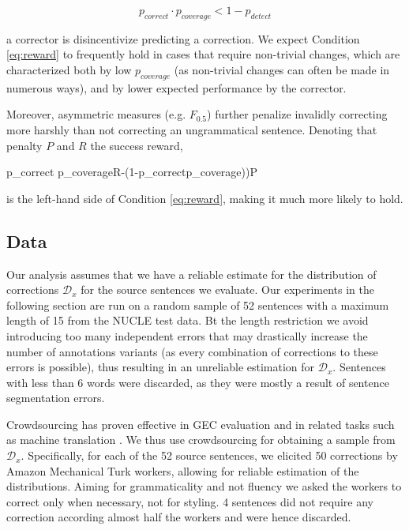 \documentclass[letter,11pt]{article}
\newenvironment{myequation}{
  \vspace{-1em}
 \begin{equation}
}{
 \end{equation}
 \vspace{-1.2em}
}
\newenvironment{myequation*}{
	\vspace{-1em}
	\begin{equation*}
}{
\end{equation*}
\vspace{-1.2em}
}
\begin{document}
\begin{small}
\begin{myequation}
  \label{eq:reward}
  p_{correct} \cdot p_{coverage} < 1-p_{detect} 
\end{myequation}
\end{small}

a corrector is disincentivize predicting a correction.
We expect Condition \ref{eq:reward} to frequently hold in cases that
require non-trivial changes, which are characterized both by low $p_{coverage}$ (as non-trivial
changes can often be made in numerous ways), and by lower expected performance by the corrector.

Moreover, asymmetric measures (e.g. $F_{0.5}$) further penalize invalidly correcting more harshly than not correcting an ungrammatical sentence. Denoting that penalty $P$ and $R$ the success reward, 

\begin{small}
	\begin{myequation*}
		p_{correct} \cdot p_{coverage}\cdot R-\left(1-p_{correct}p_{coverage})\right)\cdot P
	\end{myequation*}
\end{small}

 is the left-hand side of Condition \ref{eq:reward}, making it much more likely to hold.
\subsection{Data}
%
Our analysis assumes that we have a reliable estimate for the distribution of corrections
$\mathcal{D}_x$ for the source sentences we evaluate.
Our experiments in the following section are run on a random sample of 52 sentences with a
maximum length of 15 from the NUCLE test data.
Bt the length restriction we avoid introducing too many independent errors that may drastically increase
the number of annotations variants (as every combination of corrections to these errors is possible),
thus resulting in an unreliable estimation for $\mathcal{D}_x$.
Sentences with less than 6 words were discarded, as they were mostly a result of sentence segmentation errors.

Crowdsourcing has proven effective in GEC evaluation \cite{madnani2011they,napoles2015ground} and in
related tasks such as machine translation \cite{zaidan2011crowdsourcing,post2012constructing}. We thus
use crowdsourcing for obtaining a sample from $\mathcal{D}_x$. Specifically, for each of the 52 source
sentences, we elicited 50 corrections by Amazon Mechanical Turk workers, allowing for reliable estimation of the distributions. Aiming for grammaticality and
not fluency we asked the workers to correct only when necessary, not for styling.
4 sentences did not require any correction according almost half the workers and were hence discarded.
%
\end{document}
